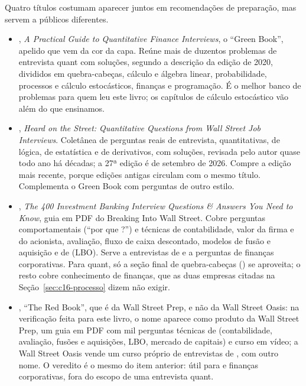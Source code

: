 Quatro títulos costumam aparecer juntos em recomendações de preparação, mas servem a públicos diferentes.

\begin{itemize}
  \item \textbf{\citet{zhou2008}}, \emph{A Practical Guide to Quantitative Finance Interviews}, o ``Green Book'', apelido que vem da cor da capa. Reúne mais de duzentos problemas de entrevista quant com soluções, segundo a descrição da edição de 2020, divididos em quebra-cabeças, cálculo e álgebra linear, probabilidade, processos e cálculo estocásticos, finanças e programação. É o melhor banco de problemas para quem leu este livro; os capítulos de cálculo estocástico vão além do que ensinamos.
  \item \textbf{\citet{crack2026}}, \emph{Heard on the Street: Quantitative Questions from Wall Street Job Interviews}. Coletânea de perguntas reais de entrevista, quantitativas, de lógica, de estatística e de derivativos, com soluções, revisada pelo autor quase todo ano há décadas; a 27ª edição é de setembro de 2026. Compre a edição mais recente, porque edições antigas circulam com o mesmo título. Complementa o Green Book com perguntas de outro estilo.
  \item \textbf{\citet{biws2009}}, \emph{The 400 Investment Banking Interview Questions \& Answers You Need to Know}, guia em PDF do Breaking Into Wall Street. Cobre perguntas comportamentais (``por que ?'') e técnicas de contabilidade, valor da firma e do acionista, avaliação, fluxo de caixa descontado, modelos de fusão e aquisição e de  (LBO). Serve a entrevistas de  e a perguntas de finanças corporativas. Para quant, só a seção final de quebra-cabeças () se aproveita; o resto cobre conhecimento de finanças, que as duas empresas citadas na Seção~\ref{sec:c16-processo} dizem não exigir.
  \item \textbf{\citet{wsp2026}}, ``The Red Book'', que é da Wall Street Prep, e não da Wall Street Oasis: na verificação feita para este livro, o nome aparece como produto da Wall Street Prep, um guia em PDF com mil perguntas técnicas de  (contabilidade, avaliação, fusões e aquisições, LBO, mercado de capitais) e curso em vídeo; a Wall Street Oasis vende um curso próprio de entrevistas de , com outro nome. O veredito é o mesmo do item anterior: útil para  e finanças corporativas, fora do escopo de uma entrevista quant.
\end{itemize}


